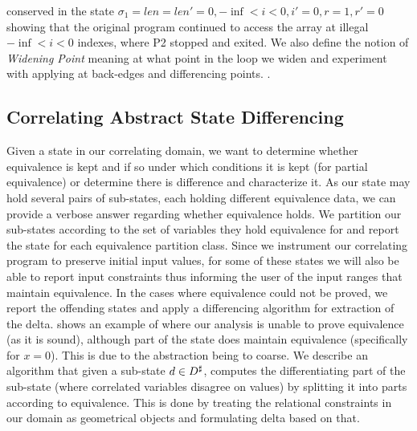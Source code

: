 conserved in the state $\sigma_1 = {len = len' =0, -\inf < i < 0, i' = 0, r = 1, r' = 0}$ showing that the original program continued to access the array at illegal $-\inf < i < 0$ indexes, where P2 stopped and exited. We also define the notion of \emph{Widening Point} meaning at what point in the loop we widen and experiment with applying at back-edges and differencing points. .

\subsection{Correlating Abstract State Differencing} 
Given a state in our correlating domain, we want to determine whether equivalence is kept and if so under which conditions it is kept (for partial equivalence) or determine there is difference and characterize it. As our state may hold several pairs of sub-states, each holding different equivalence data, we can provide a verbose answer regarding whether equivalence holds. We partition our sub-states according to the set of variables they hold equivalence for and report the state for each equivalence partition class. Since we instrument our correlating program to preserve initial input values, for some of these states we will also be able to report input constraints thus informing the user of the input ranges that maintain equivalence. In the cases where equivalence could not be proved, we report the offending states and apply a differencing algorithm for extraction of the delta.  shows an example of where our analysis is unable to prove equivalence (as it is sound), although part of the state does maintain equivalence (specifically for $x=0$). This is due to the abstraction being to coarse. We describe an algorithm that given a sub-state $d \in D^\sharp$, computes the differentiating part of the sub-state (where correlated variables disagree on values) by splitting it into parts according to equivalence. This is done by treating the relational constraints in our domain as geometrical objects and formulating delta based on that.

